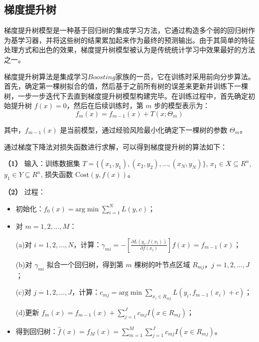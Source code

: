 \documentclass[withoutpreface,bwprint]{cumcmthesis}
\begin{document}
\subsection{梯度提升树}

梯度提升树模型是一种基于回归树的集成学习方法，它通过构造多个弱的回归树作为基学习器，并将这些树的结果累加起来作为最终的预测输出。由于其简单的特征处理方式和出色的效果，梯度提升树模型被认为是传统统计学习中效果最好的方法之一。

梯度提升树算法是集成学习\(Boosting\)家族的一员，它在训练时采用前向分步算法。首先，确定第一棵树拟合的值，然后基于之前所有树的误差来更新并训练下一棵树，一步一步迭代下去直到梯度提升树模型构建完毕。在训练过程中，首先确定初始提升树 \( f(x) = 0 \)，然后在后续训练时，第 \( m \) 步的模型表示为：
\[ f_m(x) = f_{m-1}(x) + T(x;\Theta_m) \]

其中，\( f_{m-1}(x) \) 是当前模型，通过经验风险最小化确定下一棵树的参数 \( \Theta_m \)。

通过梯度下降法对损失函数进行求解，可以得到梯度提升树的算法如下：

\textbf{（1）} 输入：训练数据集 \( T = \{(x_1, y_1), (x_2, y_2), ..., (x_N, y_N)\} \), \( x_1 \in X \subseteq R^n \), \( y_1 \in Y \subseteq R^n \), 损失函数 \( \text{Cost}(y, f(x)) \)。

\textbf{（2）} 过程：

\begin{itemize}[itemindent=2em]

\item 初始化：\( f_0(x) = \text{arg}\min \sum^N_{i=1} L(y, c) \)；

\item 对 \( m = 1, 2, ..., M \)：

(a)对 \( i = 1, 2, ..., N \)，计算：\( \gamma_{mi} = -\left[\frac{\partial L(y_i, f(x_i))}{\partial f(x_i)}\right]f(x) = f_{m-1}(x) \)；

(b)对 \( \gamma_{mi} \) 拟合一个回归树，得到第 \( m \) 棵树的叶节点区域 \( R_{mj} \)，\( j = 1, 2, ..., J \)；

(c)对 \( j = 1, 2, ..., J \)，计算：\( c_{mj} = \text{arg}\min \sum_{x_i \in R_{mj}} L(y_i, f_{m-1}(x_i) + c) \)；

(d)更新 \( f_m(x) = f_{m-1}(x) + \sum^J_{j=1} c_{mj} I(x \in R_{mj}) \)；

\item 得到回归树：\( \hat{f}(x) = f_M(x) = \sum^M_{m=1} \sum^J_{j=1} c_{mj} I(x \in R_{mj}) \)。

\end{itemize}
\end{document}

